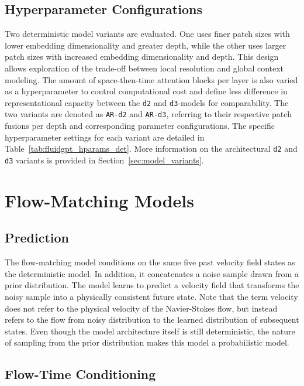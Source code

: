 \subsection{Hyperparameter Configurations}

Two deterministic model variants are evaluated. One uses finer patch sizes with lower embedding dimensionality and greater depth, while the other uses larger patch sizes with increased embedding dimensionality and depth. This design allows exploration of the trade-off between local resolution and global context modeling. The amount of space-then-time attention blocks per layer is also varied as a hyperparameter to control computational cost and define less difference in representational capacity between the \texttt{d2} and \texttt{d3}-models for comparability. The two variants are denoted as \texttt{AR-d2} and \texttt{AR-d3}, referring to their respective patch fusions per depth and corresponding parameter configurations. The specific hyperparameter settings for each variant are detailed in Table~\ref{tab:fluidgpt_hparams_det}. More information on the architectural \texttt{d2} and \texttt{d3} variants is provided in Section~\ref{sec:model_variants}.



\section{Flow-Matching Models}

\subsection{Prediction}

The flow-matching model conditions on the same five past velocity field states as the deterministic model. In addition, it concatenates a noise sample drawn from a prior distribution. The model learns to predict a velocity field that transforms the noisy sample into a physically consistent future state. Note that the term velocity does not refer to the physical velocity of the Navier-Stokes flow, but instead refers to the flow from noisy distribution to the learned distribution of subsequent states. Even though the model architecture itself is still deterministic, the nature of sampling from the prior distribution makes this model a probabilistic model.

\subsection{Flow-Time Conditioning}

